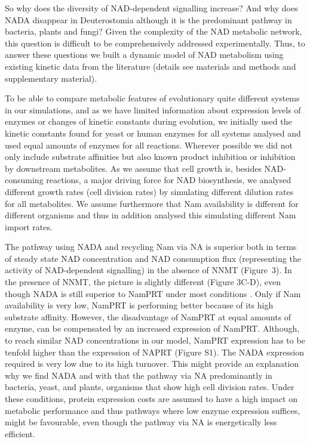 \documentclass[paper=a4, 12pt]{scrartcl}
\begin{document}
So why does the diversity of NAD-dependent signalling increase? And why does NADA disappear in Deuterostomia although it is the predominant pathway in bacteria, plants and fungi? Given the complexity of the NAD metabolic network, this question is difficult to be comprehensively addressed experimentally. Thus, to answer these questions we built a dynamic model of NAD metabolism using existing kinetic data from the literature (details see materials and methods and supplementary material).

To be able to compare metabolic features of evolutionary quite different systems in our simulations, and as we have limited information about expression levels of enzymes or changes of kinetic constants during evolution, we initially used the kinetic constants found for yeast or human enzymes for all systems analysed and used equal amounts of enzymes for all reactions. Wherever possible we did not only include substrate affinities but also known product inhibition or inhibition by downstream metabolites. As we assume that cell growth is, besides NAD-consuming reactions, a major driving force for NAD biosynthesis, we analysed different growth rates (cell division rates) by simulating different dilution rates for all metabolites. We assume furthermore that Nam availability is different for different organisms and thus in addition analysed this simulating different Nam import rates.

The pathway using NADA and recycling Nam via NA is superior  both in terms of steady state NAD concentration and NAD consumption flux (representing the activity of NAD-dependent signalling) in the absence of NNMT (Figure 3). In the presence of NNMT, the picture is slightly different (Figure 3C-D), even though NADA is still superior to NamPRT under most conditions . Only if Nam availability is very low, NamPRT is performing better because of its high substrate affinity. However, the disadvantage of NamPRT at equal amounts of enzyme, can be compensated by an increased expression of NamPRT. Although, to reach similar NAD concentrations in our model, NamPRT expression has to be tenfold higher than the expression of NAPRT (Figure S1). The NADA expression required is very low due to its high turnover. This might provide an explanation why we find NADA and with that the pathway via NA predominantly in bacteria, yeast, and plants, organisms that show high cell division rates. Under these conditions, protein expression costs are assumed to have a high impact on metabolic performance  and thus pathways where low enzyme expression suffices, might be favourable, even though the pathway via NA is energetically less efficient.
\end{document}

